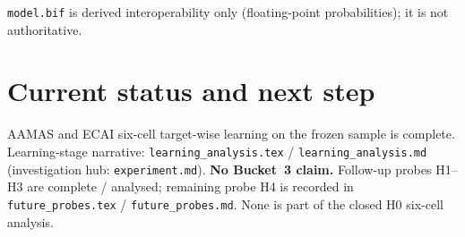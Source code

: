 \documentclass[11pt]{article}
\begin{document}
\texttt{model.bif} is derived interoperability only (floating-point probabilities);
it is not authoritative.

\section{Current status and next step}

AAMAS and ECAI six-cell target-wise learning on the frozen sample is complete.
Learning-stage narrative:
\texttt{learning\_analysis.tex} / \texttt{learning\_analysis.md}
(investigation hub: \texttt{experiment.md}).
\textbf{No Bucket~3 claim.}
Follow-up probes H1--H3 are complete / analysed; remaining probe H4 is recorded
in \texttt{future\_probes.tex} / \texttt{future\_probes.md}. None is
part of the closed H0 six-cell analysis.
\end{document}
